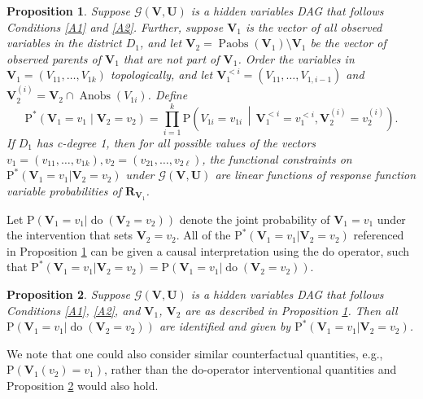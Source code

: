 \documentclass[12pt]{article}
\newtheorem{proposition}{Proposition}
\def\Pr{{\mathrm{P}}}
\def\Pdo{{\mathrm{P}^*}}
\DeclareMathOperator{\Anobs}{Anobs}
\DeclareMathOperator{\Paobs}{Paobs}
\newcommand{\bU}{\boldsymbol{U}}
\newcommand{\bV}{\boldsymbol{V}}
\DeclareMathOperator{\Do}{do}
\begin{document}
\begin{proposition} \label{prop:ident}
Suppose $\mathcal{G}(\bV, \bU)$ is a hidden variables DAG that follows Conditions \ref{A1} and \ref{A2}. Further, suppose $\bV_1$ is the vector of all observed variables in the district $D_1$, and let $\bV_2 = \Paobs(\bV_1) \setminus \bV_1$ be the vector of observed parents of $\bV_1$ that are not part of $\bV_1$. Order the variables in $\bV_1=(V_{11},\ldots,V_{1k})$ topologically,
and let $\bV_1^{<i}=(V_{11},\ldots,V_{1,i-1})$ and
$\bV_2^{(i)}=\bV_2\cap \Anobs(V_{1i})$.  Define
\[
    \Pdo(\bV_1=v_1\mid \bV_2=v_2)
    =
    \prod_{i=1}^k
    \Pr\!\left(
        V_{1i}=v_{1i}
        \,\middle|\,
        \bV_1^{<i}=v_1^{<i},
        \bV_2^{(i)}=v_2^{(i)}
    \right).
\]
If $D_1$ has c-degree 1, then for all possible values of the vectors $v_1 = (v_{11}, \ldots, v_{1k}), v_2 = (v_{21}, \ldots, v_{2\ell})$, the functional constraints on $\Pdo(\bV_1 = v_{1} |\bV_2 = v_2)$ under $\mathcal{G}(\bV, \bU)$ are linear functions of response function variable probabilities of $\mathbf{R}_{\bV_1}$.
\end{proposition}

Let $\Pr(\bV_1 = v_1 | \Do(\bV_2 = v_2))$ denote the joint probability of $\bV_1 = v_1$ under the intervention that sets $\bV_2 = v_2$. All of the $\Pdo(\bV_1 = v_{1} |\bV_2 = v_2)$ referenced in Proposition \ref{prop:ident} can be given a causal interpretation using the do operator, such that $\Pdo(\bV_1 = v_{1} |\bV_2 = v_2) =  \Pr(\bV_1 = v_{1} | \Do(\bV_2 = v_2))$. 

\begin{proposition} \label{causalprop}
Suppose $\mathcal{G}(\bV, \bU)$ is a hidden variables DAG that follows Conditions \ref{A1}, \ref{A2}, and $\bV_1$, $\bV_2$ are as described in Proposition \ref{prop:ident}. Then all $\Pr(\bV_1 = v_{1} | \Do(\bV_2 = v_2))$ are identified and given by $\Pdo(\bV_1 = v_1|\bV_2=v_2)$. 
\end{proposition}
We note that one could also consider similar counterfactual quantities, e.g., $\Pr(\bV_1(v_2)=v_1)$, rather than the do-operator interventional quantities and Proposition \ref{causalprop} would also hold.
\end{document}
